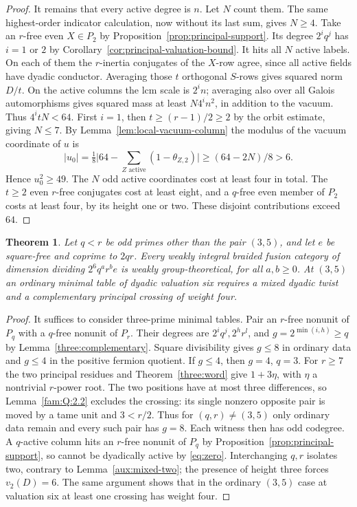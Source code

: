 \documentclass[11pt,a4paper]{article}
\numberwithin{equation}{section}
\newtheorem{theorem}{Theorem}[section]
\theoremstyle{remark}
\begin{document}
\begin{proof}
It remains that every active degree is $n$. Let $N$ count them.
The same highest-order indicator calculation, now without its last
sum, gives $N\ge4$. Take an $r$-free even $X\in P_2$ by
Proposition~\ref{prop:principal-support}. Its degree $2^i q^j$ has
$i=1$ or $2$ by Corollary~\ref{cor:principal-valuation-bound}.
It hits all $N$ active labels. On each of them the $r$-inertia
conjugates of the $X$-row agree, since all active fields have
dyadic conductor. Averaging those $t$ orthogonal $S$-rows gives
squared norm $D/t$. On the active columns the lcm scale is
$2^i n$; averaging also over all Galois automorphisms gives squared
mass at least $N4^i n^2$, in addition to the vacuum. Thus
$4^itN<64$. First $i=1$, then $t\ge(r-1)/2\ge2$ by the orbit
estimate, giving $N\le7$.
By Lemma~\ref{lem:local-vacuum-column} the modulus of the vacuum
coordinate of $u$ is
\[
       |u_0|=\tfrac18\bigl|64-\sum_{Z\text{ active}}
                              (1-\theta_{Z,2})\bigr|
                    \ge (64-2N)/8>6 .
\]
Hence $u_0^2\ge49$. The $N$ odd active coordinates cost at least four
in total. The $t\ge2$ even $r$-free conjugates cost at least eight,
and a $q$-free even member of $P_2$ costs at least four, by its height
one or two. These disjoint contributions exceed $64$.
\end{proof}

\begin{theorem}\label{aux:dyadic-six}
Let $q<r$ be odd primes other than the pair $(3,5)$, and let $e$
be square-free and coprime to $2qr$. Every weakly integral braided
fusion category of dimension dividing $2^6q^a r^b e$ is weakly
group-theoretical, for all $a,b\ge0$. At $(3,5)$ an ordinary
minimal table of dyadic valuation six requires a mixed dyadic twist
and a complementary principal crossing of weight four.
\end{theorem}
\begin{proof}
It suffices to consider three-prime minimal tables. Pair an $r$-free
nonunit of $P_q$ with a $q$-free nonunit of $P_r$. Their degrees are
$2^i q^j,2^h r^l$, and $g=2^{\min(i,h)}\ge q$ by
Lemma~\ref{three:complementary}. Square divisibility gives $g\le8$
in ordinary data and $g\le4$ in the positive fermion quotient.
If $g\le4$, then $g=4$, $q=3$. For $r\ge7$ the two principal
residues and Theorem~\ref{three:word} give $1+3\eta$, with $\eta$
a nontrivial $r$-power root. The two positions have at most three
differences, so Lemma~\ref{fam:Q:2.2} excludes the crossing: its
single nonzero opposite pair is moved by a tame unit and $3<r/2$.
Thus for $(q,r)\ne(3,5)$ only ordinary data remain and every such
pair has $g=8$. Each witness then has odd codegree. A $q$-active
column hits an $r$-free nonunit of $P_q$ by
Proposition~\ref{prop:principal-support}, so cannot be dyadically
active by \eqref{eq:zero}. Interchanging $q,r$ isolates two,
contrary to Lemma~\ref{aux:mixed-two}; the presence of height three
forces $v_2(D)=6$. The same argument shows that in the ordinary
$(3,5)$ case at valuation six at least one crossing has weight four.
\end{proof}
\end{document}
